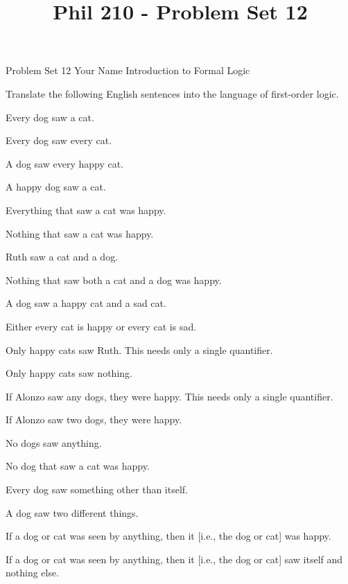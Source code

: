 
\title{Phil 210 - Problem Set 12}

\heading
Problem Set 12
Your Name
Introduction to Formal Logic
\endheading

Translate the following English sentences into the language of first-order logic.

\quantifiers
\problems
{}
Every dog saw a cat.
	\answer
	$ $
	\endanswer

Every dog saw every cat.
	\answer
	$ $
	\endanswer

A dog saw every happy cat.
	\answer
	$ $
	\endanswer

A happy dog saw a cat.
	\answer
	$ $
	\endanswer

Everything that saw a cat was happy.
	\answer
	$ $
	\endanswer

Nothing that saw a cat was happy.
	\answer
	$ $
	\endanswer

Ruth saw a cat and a dog.
	\answer
	$ $
	\endanswer

Nothing that saw both a cat and a dog was happy.
	\answer
	$ $
	\endanswer

A dog saw a happy cat and a sad cat.
	\answer
	$ $
	\endanswer

Either every cat is happy or every cat is sad.
	\answer
	$ $
	\endanswer

Only happy cats saw Ruth.
\Hint This needs only a single quantifier.
	\answer
	$ $
	\endanswer

Only happy cats saw nothing.
	\answer
	$ $
	\endanswer

If Alonzo saw any dogs, they were happy.
\Hint This needs only a single quantifier.
	\answer
	$ $
	\endanswer

If Alonzo saw two dogs, they were happy.
	\answer
	$ $
	\endanswer

No dogs saw anything.
	\answer
	$ $
	\endanswer

No dog that saw a cat was happy.
	\answer
	$ $
	\endanswer

Every dog saw something other than itself.
	\answer
	$ $
	\endanswer

A dog saw two different things.
	\answer
	$ $
	\endanswer

If a dog or cat was seen by anything, then it [i.e., the dog or cat] was happy.
	\answer
	$ $
	\endanswer

If a dog or cat was seen by anything, then it [i.e., the dog or cat] saw itself and nothing else.
	\answer
	$ $
	\endanswer

\endproblems
\bye
